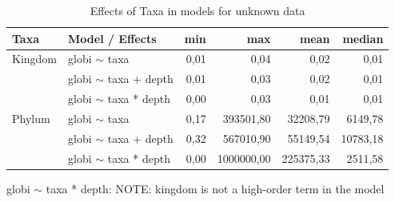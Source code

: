     \begin{table}[h!]
      \begin{center}
        \begin{tabular}{ |l|l|r|r|r|r| }
          \hline
          Taxa & Model / Effects & min & max & mean & median \\
          \hline \hline
          Kingdom & globi $\sim$ taxa         & 0,01 & 0,04 & 0,02 & 0,01 \\
                  & globi $\sim$ taxa + depth & 0,01 & 0,03 & 0,02 & 0,01 \\
                  & globi $\sim$ taxa * depth & 0,00 & 0,03 & 0,01 & 0,01 \\
          \hline
          Phylum & globi $\sim$ taxa          & 0,17 & 393501,80 & 32208,79 & 6149,78 \\
                  & globi $\sim$ taxa + depth & 0,32 & 567010,90 & 55149,54 & 10783,18 \\
                  & globi $\sim$ taxa * depth & 0,00 & 1000000,00 & 225375,33 & 2511,58 \\
          \hline
        \end{tabular} 
      \end{center}
      \caption{Effects of Taxa in models for unknown data}
      \label{table:Effects unknown data} 
    \end{table}

    globi $\sim$ taxa * depth: NOTE: kingdom is not a high-order term in the model

